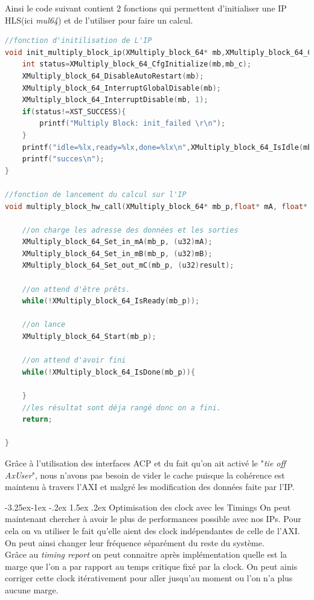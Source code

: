 \documentclass[12pt,a4paper]{article}
\makeatletter
\newcounter {subsubsubsection}[subsubsection]
\newcommand\subsubsubsection{\@startsection{subsubsubsection}{4}{\z@}%
                                     {-3.25ex\@plus -1ex \@minus -.2ex}%
                                     {1.5ex \@plus .2ex}%
                                     {\normalfont\normalsize\bfseries}}
\makeatother
\begin{document}
Ainsi le code suivant contient 2 fonctions qui permettent d'initialiser une IP HLS(ici \textit{mul64}) et de l'utiliser pour faire un calcul.
\begin{lstlisting}[language=C]
//fonction d'initilisation de L'IP
void init_multiply_block_ip(XMultiply_block_64* mb,XMultiply_block_64_Config* mb_c){
	int status=XMultiply_block_64_CfgInitialize(mb,mb_c);
	XMultiply_block_64_DisableAutoRestart(mb);
	XMultiply_block_64_InterruptGlobalDisable(mb);
	XMultiply_block_64_InterruptDisable(mb, 1);
	if(status!=XST_SUCCESS){
		printf("Multiply Block: init_failed \r\n");
	}
	printf("idle=%lx,ready=%lx,done=%lx\n",XMultiply_block_64_IsIdle(mb),XMultiply_block_64_IsReady(mb),XMultiply_block_64_IsDone(mb));
	printf("succes\n");
}

//fonction de lancement du calcul sur l'IP
void multiply_block_hw_call(XMultiply_block_64* mb_p,float* mA, float* mB, float* result){

	//on charge les adresse des données et les sorties
	XMultiply_block_64_Set_in_mA(mb_p, (u32)mA);
	XMultiply_block_64_Set_in_mB(mb_p, (u32)mB);
	XMultiply_block_64_Set_out_mC(mb_p, (u32)result);

	//on attend d'être prêts.
	while(!XMultiply_block_64_IsReady(mb_p));
	
	//on lance
	XMultiply_block_64_Start(mb_p);
	
	//on attend d'avoir fini	
	while(!XMultiply_block_64_IsDone(mb_p)){
		
	}
	//les résultat sont déja rangé donc on a fini.
	return;

}

\end{lstlisting}
Grâce à l'utilisation des interfaces ACP et du fait qu'on ait activé le "\textit{tie off AxUser}", nous n'avons pas besoin de vider le cache puisque la cohérence est maintenu à travers l'AXI et malgré les modification des données faite par l'IP.


\subsubsubsection{Optimisation des clock avec les Timings}
On peut maintenant chercher à avoir le plus de performances possible avec nos IPs. Pour cela on va utiliser le fait qu'elle aient des clock indépendantes de celle de l'AXI. On peut ainsi changer leur fréquence séparément du reste du système.\\

Grâce au \textit{timing report} on peut connaitre après implémentation quelle est la marge que l'on a par rapport au temps critique fixé par la clock. On peut ainis corriger cette clock itérativement pour aller jusqu'au moment ou l'on n'a plus aucune marge.
\end{document}

